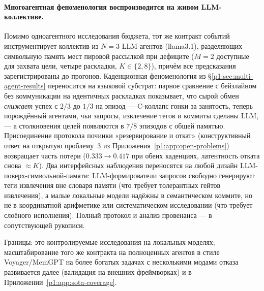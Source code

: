 \documentclass{article}
\begin{document}
\paragraph{Многоагентная феноменология воспроизводится на живом LLM-коллективе.}
Помимо одноагентного исследования бюджета, тот же контракт событий
инструментирует коллектив из $N{=}3$ LLM-агентов (llama3.1), разделяющих
символьную память мест пировой рассылкой при дефиците ($M{=}2$
доступные для захвата цели, четыре раскладки, $K\in\{2,8\}$), причём все предсказания
зарегистрированы до прогонов. Каденционная феноменология из
\S\ref{p1:sec:multi-agent-results} переносится на языковой
субстрат: парное сравнение с бейзлайном без коммуникации
на идентичных раскладках показывает, что сырой обмен \emph{снижает} успех с
$2/3$ до $1/3$ на эпизод --- C-коллапс гонки за занятость, теперь
порождённый агентами, чьи запросы, извлечение тегов и коммиты
сделаны LLM, --- а столкновения целей появляются в $7/8$ эпизодов с общей
памятью. Присоединение протокола починки «резервирование и откат»
(конструктивный ответ на открытую проблему~3 из
Приложения~\ref{p1:app:open-problems}) возвращает часть потери
($0.333\to0.417$ при обеих каденциях, латентность отката снова
${\approx}K$). Два интерфейсных наблюдения переносятся на любой
дизайн LLM-поверх-символьной-памяти: LLM-формирователи запросов свободно генерируют
теги извлечения вне словаря памяти (что требует толерантных
гейтов извлечения), а малые локальные модели надёжны в семантическом
коммите, но не в координатной арифметике или систематическом исследовании
(что требует слоёного исполнения). Полный протокол и анализ провенанса ---
в сопутствующей рукописи.

Границы: это контролируемые исследования на локальных моделях; масштабирование того же контракта на полноценных агентов в стиле Voyager/MemGPT на более богатых задачах с несколькими модами отказа развивается далее (валидация на внешних фреймворках) и в Приложении~\ref{p1:app:sota-coverage}.
\end{document}
